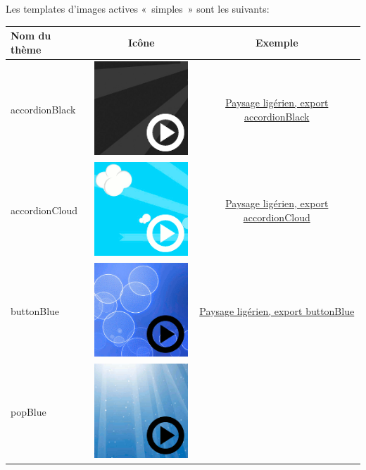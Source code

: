 \documentclass[a4paper,12pt]{report}
\begin{document}
Les templates d'images actives «~simples~» sont les suivants:
\begin{center}
\begin{tabular}{|l|c|c|}
\hline
Nom du thème & Icône & Exemple\\
\hline
accordionBlack\  & \includegraphics[scale=0.5]{./images/accordionBlack} & 
\href{http://geoffrey-gekiere.ac-versailles.fr/xia1/accordionBlack}{Paysage ligérien, export accordionBlack}\\
\hline
accordionCloud &  \includegraphics[scale=0.5]{./images/accordionCloud} & 
\href{http://geoffrey-gekiere.ac-versailles.fr/xia1/accordionCloud}{Paysage ligérien, export accordionCloud}\\
\hline
buttonBlue &  \includegraphics[scale=0.5]{./images/buttonBlue} & 
\href{http://geoffrey-gekiere.ac-versailles.fr/xia1/buttonBlue}{Paysage ligérien, export buttonBlue}\\
\hline
popBlue &  \includegraphics[scale=0.5]{./images/popBlue} & 

\end{tabular}
\end{center}
\end{document}
